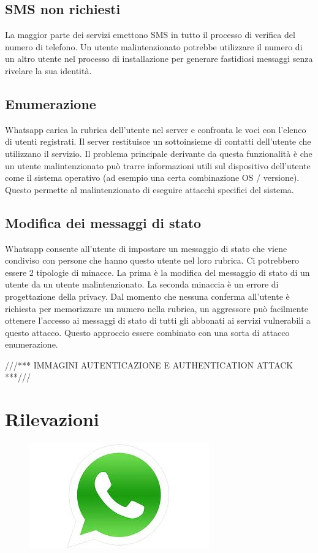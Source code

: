 \documentclass[a4paper,11pt]{book}
\begin{document}
\section{SMS non richiesti} 
La maggior parte dei servizi emettono SMS in tutto il processo di verifica del numero di telefono. Un utente malintenzionato potrebbe utilizzare il numero di un altro utente nel processo di installazione per generare fastidiosi messaggi senza rivelare la sua identità. 

\section{Enumerazione} 
Whatsapp carica la rubrica dell'utente nel server e confronta le voci con l'elenco di utenti registrati. 
Il server restituisce un sottoinsieme di contatti dell'utente che utilizzano il servizio. 
Il problema principale derivante da questa funzionalità è che un utente malintenzionato può trarre informazioni utili sul dispositivo dell'utente come il sistema operativo (ad esempio una certa combinazione OS / versione). Questo permette al malintenzionato di eseguire attacchi specifici del sistema.

\section{Modifica dei messaggi di stato} 
Whatsapp consente all'utente di impostare un messaggio di stato che viene condiviso con persone che hanno questo utente nel loro rubrica. Ci potrebbero essere 2 tipologie di minacce. 
La prima è la modifica del messaggio di stato di un utente da un utente malintenzionato. 
La seconda minaccia è un errore di progettazione della privacy. Dal momento che nessuna conferma all'utente è richiesta per memorizzare un numero nella rubrica, un aggressore può facilmente ottenere l'accesso ai messaggi di stato di tutti gli abbonati ai servizi vulnerabili a questo attacco. Questo approccio essere combinato con una sorta di attacco enumerazione.

///***
IMMAGINI AUTENTICAZIONE E AUTHENTICATION ATTACK
***///

\chapter{Rilevazioni}

\begin{figure}
\centering
\includegraphics[scale = 0.5]{whatsapp.jpg}
\end{figure}
\end{document}
